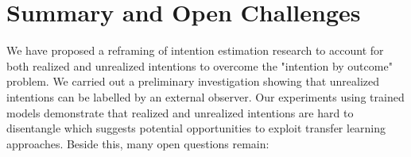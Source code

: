 \documentclass[manuscript,screen,review]{acmart}
\begin{document}



\section{Summary and Open Challenges}
%
We have proposed a reframing of intention estimation research to account for both realized and unrealized intentions to overcome the "intention by outcome" problem. We carried out a preliminary investigation showing that unrealized intentions can be labelled by an external observer. Our experiments using trained models demonstrate that realized and unrealized intentions are hard to disentangle which suggests potential opportunities to exploit transfer learning approaches. Beside this, many open questions remain:
\end{document}
